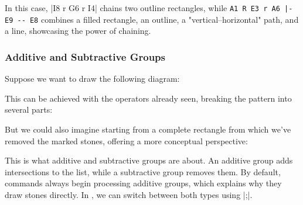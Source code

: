 \begin{goban}[9, stone = {radius = 4pt}, mark = {line = {color = red}}]
In this case, |I8 r G6 r I4| chains two outline rectangles, while \verb+A1 R E3 r A6 |- E9 -- E8+ combines a filled rectangle, an outline, a "vertical--horizontal" path, and a line, showcasing the power of chaining.

\subsubsection{Additive and Subtractive Groups}

Suppose we want to draw the following diagram:

\begin{figure}[H]
	\centering
	\begin{goban}
	\end{goban}
\end{figure}

This can be achieved with the operators already seen, breaking the pattern into several parts:

\begin{codeexample}[width=6cm]
	\begin{goban}[label = {at = all}]
		\stones[fill = {color = orange}] {A6 R B3, B2 R E1, D4 R E6}
	\end{goban}
\end{codeexample}

But we could also imagine starting from a complete rectangle from which we’ve removed the marked stones, offering a more conceptual perspective:

\begin{figure}[H]
	\centering
	\begin{goban}
		\stones[b]{A1 R E6}
		\marks[cross, line = {color = white}]{C6 |- E3, A1:2}
	\end{goban}
\end{figure}

This is what additive and subtractive groups are about. An additive group adds intersections to the list, while a subtractive group removes them. By default, commands always begin processing additive groups, which explains why they draw stones directly. In \pgfgoname, we can switch between both types using |;|.

\begin{codeexample}[width=6cm]
	\begin{goban}[label = {at = all}, partial = A1:E6]
	\end{goban}
	
	\begin{goban}[label = {at = all}, partial = A1:E6]
	\end{goban}
	

\end{codeexample}
\end{goban}

